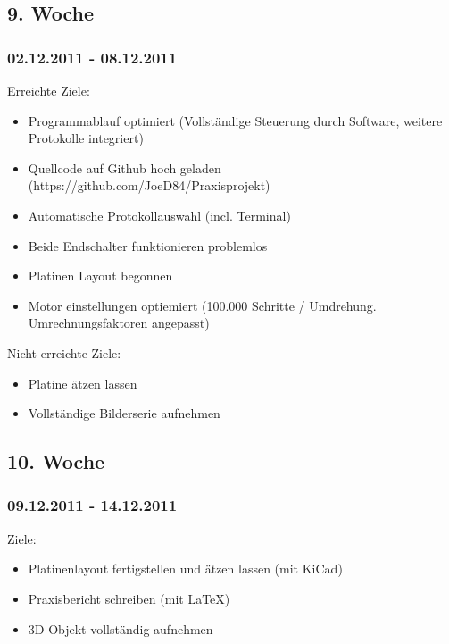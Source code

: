 \documentclass[ngerman]{beamer}
\begin{document}
\subsection{9. Woche}
\begin{frame}\frametitle{02.12.2011 - 08.12.2011}
Erreichte Ziele: 
\begin{itemize}
\item Programmablauf optimiert (Vollständige Steuerung durch Software, weitere
Protokolle integriert) 
\item Quellcode auf Github hoch geladen (https://github.com/JoeD84/Praxisprojekt) 
\item Automatische Protokollauswahl (incl. Terminal) 
\item Beide Endschalter funktionieren problemlos 
\item Platinen Layout begonnen 
\item Motor einstellungen optiemiert (100.000 Schritte / Umdrehung. Umrechnungsfaktoren
angepasst) 
\end{itemize}
Nicht erreichte Ziele: 
\begin{itemize}
\item Platine ätzen lassen 
\item Vollständige Bilderserie aufnehmen
\end{itemize}
\end{frame}
\subsection{10. Woche}
\begin{frame}\frametitle{09.12.2011 - 14.12.2011}
Ziele: 
\begin{itemize}
\item Platinenlayout fertigstellen und ätzen lassen (mit KiCad) 
\item Praxisbericht schreiben (mit \LaTeX{}) 
\item 3D Objekt vollständig aufnehmen
\end{itemize}
\end{frame}
\end{document}
